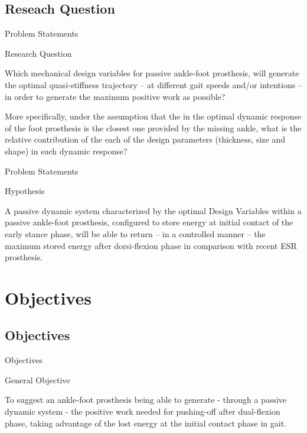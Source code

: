 \documentclass[10pt]{beamer}
\begin{document}
\subsection{Reseach Question}
\begin{frame}{Problem Statements}

\begin{block}{Research Question}

Which mechanical design variables for passive ankle-foot prosthesis, will generate the optimal quasi-stiffness trajectory \--- at different gait speeds and/or intentions \--- in order to generate the maximum positive work as possible?

More specifically, under the assumption that the in the optimal dynamic response of the foot prosthesis is the closest one provided by the missing ankle, what is the relative contribution of the each of the design parameters (thickness, size and shape) in such dynamic response? 

\end{block}
\end{frame}

\begin{frame}{Problem Statements}

\begin{block}{Hypothesis}

A passive dynamic system characterized by the optimal Design Variables within a passive ankle-foot prosthesis, configured to store energy at initial contact of the early stance phase, will be able to return \--- in a controlled manner \---  the maximum stored energy after dorsi-flexion phase in comparison with recent ESR prosthesis.

\end{block}
\end{frame}

\section{Objectives}

\subsection{Objectives}
\begin{frame}{Objectives}

\begin{alertblock}{General Objective}

To suggest an ankle-foot prosthesis being able to generate - through a passive dynamic system - the positive work needed for pushing-off after dual-flexion phase, taking advantage of the lost energy at the initial contact phase in gait.

\end{alertblock}
\end{frame}
\end{document}
